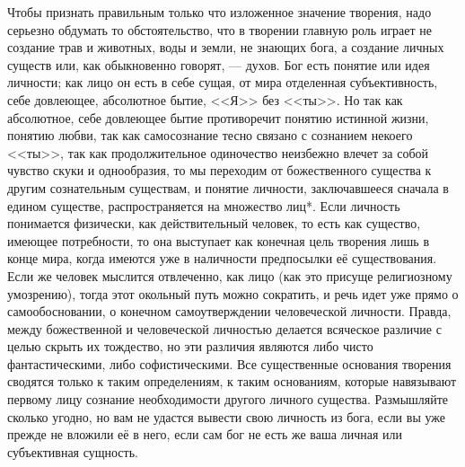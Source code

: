 \documentclass[12pt,oneside]{book}
\begin{document}
Чтобы признать правильным только что изложенное значение творения, надо серьезно обдумать то обстоятельство, что в творении главную роль играет не создание трав и животных, воды и земли, не знающих бога, а создание личных существ или, как обыкновенно говорят, --- духов. Бог есть понятие или идея личности; как лицо он есть в себе сущая, от мира отделенная субъективность, себе довлеющее, абсолютное бытие, <<Я>> без <<ты>>. Но так как абсолютное, себе довлеющее бытие противоречит понятию истинной жизни, понятию любви, так как самосознание тесно связано с сознанием некоего <<ты>>, так как продолжительное одиночество неизбежно влечет за собой чувство скуки и однообразия, то мы переходим от божественного существа к другим сознательным существам, и понятие личности, заключавшееся сначала в едином существе, распространяется на множество лиц*\let\svthefootnote\thefootnote\let\thefootnote\relax{}\let\thefootnote\svthefootnote. Если личность понимается физически, как действительный человек, то есть как существо, имеющее потребности, то она выступает как конечная цель творения лишь в конце мира, когда имеются уже в наличности предпосылки её существования. Если же человек мыслится отвлеченно, как лицо (как это присуще религиозному умозрению), тогда этот окольный путь можно сократить, и речь идет уже прямо о самообосновании, о конечном самоутверждении человеческой личности. Правда, между божественной и человеческой личностью делается всяческое различие с целью скрыть их тождество, но эти различия являются либо чисто фантастическими, либо софистическими. Все существенные основания творения сводятся только к таким определениям, к таким основаниям, которые навязывают первому лицу сознание необходимости другого личного существа. Размышляйте сколько угодно, но вам не удастся вывести свою личность из бога, если вы уже прежде не вложили её в него, если сам бог не есть же ваша личная или субъективная сущность.
\end{document}
